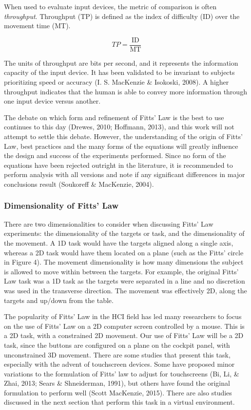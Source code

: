 When used to evaluate input devices, the metric of comparison is often \emph{throughput}. Throughput (TP) is defined as the index of difficulty (ID) over the movement time (MT).

\[TP = \frac{\text{ID}}{\text{MT}}\]

The units of throughput are bits per second, and it represents the information capacity of the input device. It has been validated to be invariant to subjects prioritizing speed or accuracy (I. S. MacKenzie \& Isokoski, 2008). A higher throughput indicates that the human is able to convey more information through one input device versus another.

The debate on which form and refinement of Fitts' Law is the best to use continues to this day (Drewes, 2010; Hoffmann, 2013), and this work will not attempt to settle this debate. However, the understanding of the origin of Fitts' Law, best practices and the many forms of the equations will greatly influence the design and success of the experiments performed. Since no form of the equations have been rejected outright in the literature, it is recommended to perform analysis with all versions and note if any significant differences in major conclusions result (Soukoreff \& MacKenzie, 2004).

\subsubsection{Dimensionality of Fitts' Law}\label{dimensionality-of-fitts-law}

There are two dimensionalities to consider when discussing Fitts' Law experiments: the dimensionality of the targets or task, and the dimensionality of the movement. A 1D task would have the targets aligned along a single axis, whereas a 2D task would have them located on a plane (such as the Fitts' circle in Figure 4). The movement dimensionality is how many dimensions the subject is allowed to move within between the targets. For example, the original Fitts' Law task was a 1D task as the targets were separated in a line and no discretion was used in the transverse direction. The movement was effectively 2D, along the targets and up/down from the table.

The popularity of Fitts' Law in the HCI field has led many researchers to focus on the use of Fitts' Law on a 2D computer screen controlled by a mouse. This is a 2D task, with a constrained 2D movement. Our use of Fitts' Law will be a 2D task, since the buttons are configured on a plane on the cockpit panel, with unconstrained 3D movement. There are some studies that present this task, especially with the advent of touchscreen devices. Some have proposed minor variations to the formulation of Fitts' law to adjust for touchscreens (Bi, Li, \& Zhai, 2013; Sears \& Shneiderman, 1991), but others have found the original formulation to perform well (Scott MacKenzie, 2015). There are also studies discussed in the next section that perform this task in a virtual environment.

